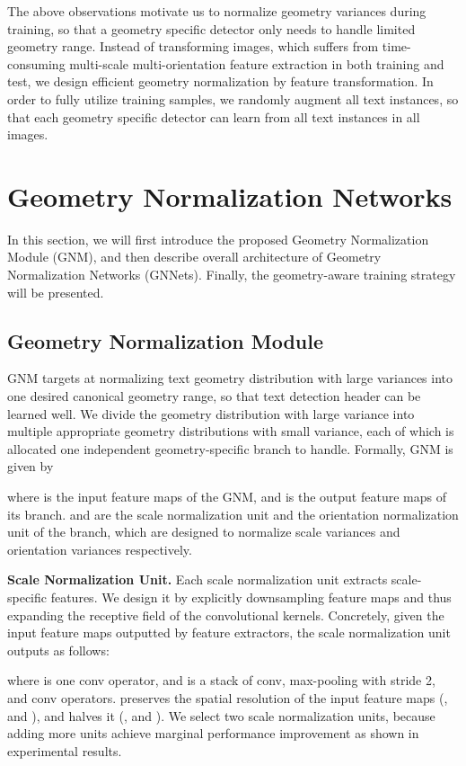 \documentclass[10pt,twocolumn,letterpaper]{article}
\begin{document}
The above observations motivate us to normalize geometry variances during training, so that a geometry specific detector only needs to handle limited geometry range. Instead of transforming images, which suffers from time-consuming multi-scale multi-orientation feature extraction in both training and test, we design efficient geometry normalization by feature transformation. In order to fully utilize training samples, we randomly augment all text instances, so that each geometry specific detector can learn from all text instances in all images.

\section{Geometry Normalization Networks}


In this section, we will first introduce the proposed Geometry Normalization Module (GNM), and then describe overall architecture of Geometry Normalization Networks (GNNets). Finally, the geometry-aware training strategy will be presented.

\subsection{Geometry Normalization Module}

GNM targets at normalizing text geometry distribution with large variances into one desired canonical geometry range, so that text detection header can be learned well.
We divide the geometry distribution with large variance into multiple appropriate geometry distributions with small variance, each of which is allocated one independent geometry-specific branch to handle. Formally, GNM is given by

where  is the input feature maps of the GNM, and  is the output feature maps of its  branch.
 and   are the scale normalization unit and the orientation normalization unit of the  branch, which are designed to normalize scale variances and orientation variances respectively.





\textbf{Scale Normalization Unit.}  Each scale normalization unit extracts scale-specific features. We design it by explicitly downsampling feature maps and thus expanding the
receptive field of the convolutional kernels.
Concretely, given the input feature maps  outputted by feature extractors, the scale normalization unit outputs   as follows:

where  is one  conv operator, and  is a stack of  conv,  max-pooling with stride 2, and  conv operators.  preserves the spatial resolution of the input feature maps (\ie,  and ), and  halves it (\ie,  and ). We select two scale normalization units, because adding more units achieve marginal performance improvement as shown in experimental results.
\end{document}
